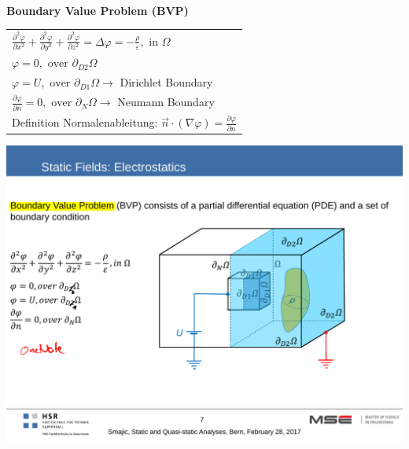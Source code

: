 \textbf{\\ Boundary Value Problem (BVP)\\}
\begin{minipage}[lt]{11cm}
	\begin{tabular}{l}
		\(\displaystyle \frac{\partial^2 \varphi}{\partial x^2} + \frac{\partial^2 \varphi}{\partial y^2} +\frac{\partial^2 \varphi}{\partial z^2} = \Delta \varphi = - \frac{\rho}{\varepsilon}, \textrm{ in } \Omega\) \\
		\(\displaystyle \varphi = 0, \textrm{ over } \partial_{D2} \Omega \) \\
		\(\displaystyle \varphi = U, \textrm{ over } \partial_{D1} \Omega \rightarrow \) Dirichlet Boundary \\
		\(\displaystyle \frac{\partial \varphi}{\partial n} = 0, \textrm{ over } \partial_{N} \Omega \rightarrow \) Neumann Boundary \\	
		Definition Normalenableitung: \(\displaystyle \vec{n} \cdot \left(\nabla \varphi\right) = \frac{\partial \varphi}{\partial n}\)	
	\end{tabular}
\end{minipage}
\begin{minipage}[rt]{8cm}
	\includegraphics[width=.8\textwidth]{./images/BVP_electrostatic.pdf}
\end{minipage}